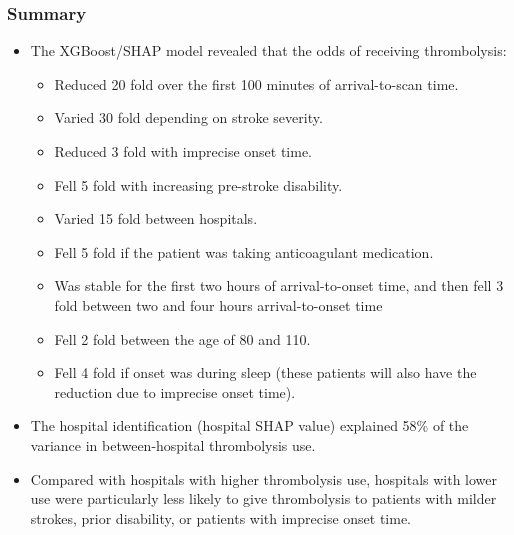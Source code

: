 
\begin{frame}
\frametitle{Summary}
\small

\begin{itemize}
    \item The XGBoost/SHAP model revealed that the odds of receiving thrombolysis:
    
    \begin{itemize}
        \scriptsize
        \item Reduced 20 fold over the first 100 minutes of arrival-to-scan time.
        \item Varied 30 fold depending on stroke severity.
        \item Reduced 3 fold with imprecise onset time.
        \item Fell 5 fold with increasing pre-stroke disability.
        \item Varied 15 fold between hospitals. 
        \item Fell 5 fold if the patient was taking anticoagulant medication.
        \item Was stable for the first two hours of arrival-to-onset time, and then fell 3 fold between two and four hours arrival-to-onset time
        \item Fell 2 fold between the age of 80 and 110.
        \item Fell 4 fold if onset was during sleep (these patients will also have the reduction due to imprecise onset time). 
    \end{itemize}

\small
\item The hospital identification (hospital SHAP value) explained 58\% of the variance in between-hospital thrombolysis use. 

\item Compared with hospitals with higher thrombolysis use, hospitals with lower use were particularly less likely to give thrombolysis to patients with milder strokes, prior disability, or patients with imprecise onset time.
\end{itemize}

\end{frame}
